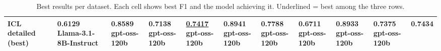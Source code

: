 \begin{table}[t]
\begin{adjustbox}{width=\textwidth}
\begin{tabular}{lllllllllll}
ICL detailed (best) & \shortstack{0.6129\\{\scriptsize Llama-3.1-8B-Instruct}} & \shortstack{0.8589\\{\scriptsize gpt-oss-120b}} & \shortstack{0.7138\\{\scriptsize gpt-oss-120b}} & \shortstack{\underline{0.7417}\\{\scriptsize gpt-oss-120b}} & \shortstack{0.8941\\{\scriptsize gpt-oss-120b}} & \shortstack{0.7788\\{\scriptsize gpt-oss-120b}} & \shortstack{0.6711\\{\scriptsize gpt-oss-120b}} & \shortstack{0.8933\\{\scriptsize gpt-oss-120b}} & \shortstack{0.7375\\{\scriptsize gpt-oss-120b}} & \shortstack{0.7434\\{\scriptsize }} \\
\bottomrule
\end{tabular}
\end{adjustbox}
\caption{Best results per dataset. Each cell shows best F1 and the model achieving it. Underlined = best among the three rows.}
\end{table}
